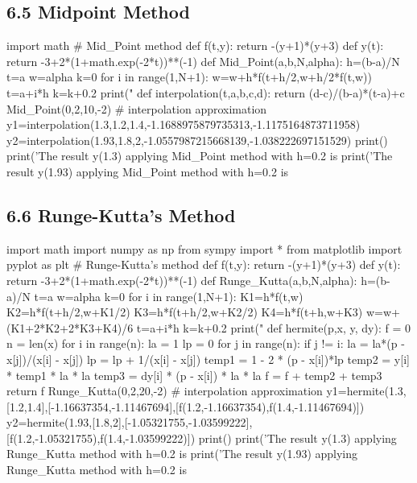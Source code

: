 \documentclass{article}
\begin{document}
\subsection{6.5 Midpoint Method}
\begin{python}
import math
# Mid_Point method
def f(t,y):
    return -(y+1)*(y+3)
def y(t):
    return -3+2*(1+math.exp(-2*t))**(-1)
def Mid_Point(a,b,N,alpha):
    h=(b-a)/N
    t=a
    w=alpha
    k=0
    for i in range(1,N+1):
        w=w+h*f(t+h/2,w+h/2*f(t,w))
        t=a+i*h
        k=k+0.2
        print("%
def interpolation(t,a,b,c,d):
    return (d-c)/(b-a)*(t-a)+c
Mid_Point(0,2,10,-2)
# interpolation approximation 
y1=interpolation(1.3,1.2,1.4,-1.1688975879735313,-1.1175164873711958)
y2=interpolation(1.93,1.8,2,-1.0557987215668139,-1.038222697151529)
print()
print('The result y(1.3) applying Mid_Point method with h=0.2 is %
print('The result y(1.93) applying Mid_Point method with h=0.2 is %
\end{python}

\subsection{6.6 Runge-Kutta's Method}
\begin{python}
import math
import numpy as np
from sympy import *
from matplotlib import pyplot as plt
# Runge-Kutta's method
def f(t,y):
    return -(y+1)*(y+3)
def y(t):
    return -3+2*(1+math.exp(-2*t))**(-1)
def Runge_Kutta(a,b,N,alpha):
    h=(b-a)/N
    t=a
    w=alpha
    k=0
    for i in range(1,N+1):
        K1=h*f(t,w)
        K2=h*f(t+h/2,w+K1/2)
        K3=h*f(t+h/2,w+K2/2)
        K4=h*f(t+h,w+K3)
        w=w+(K1+2*K2+2*K3+K4)/6
        t=a+i*h
        k=k+0.2
        print("%
def hermite(p,x, y, dy):
    f = 0
    n = len(x)
    for i in range(n):
        la = 1
        lp = 0
        for j in range(n):
            if j != i:
                la = la*(p - x[j])/(x[i] - x[j])
                lp = lp + 1/(x[i] - x[j])
        temp1 = 1 - 2 * (p - x[i])*lp
        temp2 = y[i] * temp1 * la * la
        temp3 = dy[i] * (p - x[i]) * la * la
        f = f + temp2 + temp3
    return f
Runge_Kutta(0,2,20,-2)
# interpolation approximation 
y1=hermite(1.3,[1.2,1.4],[-1.16637354,-1.11467694],[f(1.2,-1.16637354),f(1.4,-1.11467694)])
y2=hermite(1.93,[1.8,2],[-1.05321755,-1.03599222],[f(1.2,-1.05321755),f(1.4,-1.03599222)])
print()
print('The result y(1.3) applying Runge_Kutta method with h=0.2 is %
print('The result y(1.93) applying Runge_Kutta method with h=0.2 is %
\end{python}
\end{document}
